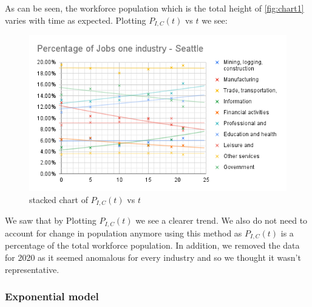             As can be seen, the workforce population which is the total height of \ref{fig:chart1} varies with time as expected.
            Plotting $P_{I,C}(t)$ vs $t$ we see: 
            \begin{figure}[H]
                  \includegraphics[width=\linewidth]{images/D111796A-6172-47DA-A494-CF6D7A966055.png}
                  \caption{stacked chart of $P_{I,C}(t)$ vs $t$ }
                  \label{fig:chart2}
                \end{figure}
                
                We saw that by Plotting $P_{I,C}(t)$ we see a clearer trend. We also do not need to account for change in population anymore using this method as $P_{I,C}(t)$ is a percentage of the total workforce population. In addition, we removed the data for 2020 as it seemed anomalous for every industry and so we thought it wasn't representative.
                
                
                
            \subsubsection{Exponential model}
            
                
